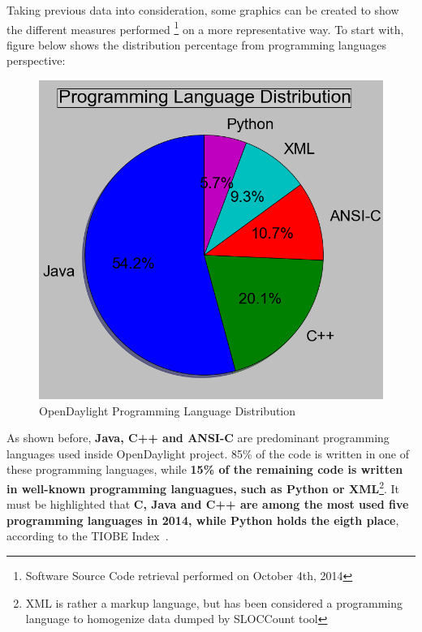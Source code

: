 \documentclass[a4paper, 12pt]{book}
\begin{document}
Taking previous data into consideration, some graphics can be created to show the different measures performed \footnote{Software Source Code retrieval performed on October 4th, 2014} on a more representative way. To start with, figure below shows the distribution percentage from programming languages perspective:
\begin{center}
 \begin{figure}[H]
 \begin{center}
   \includegraphics[width=15cm]{img/sloc-distritbution-01.png}
   \caption{OpenDaylight Programming Language Distribution}
   \label{fig:odl_prog_dist_diagram}
 \end{center}
 \end{figure}
\end{center}
As shown before, \textbf{Java, C++ and ANSI-C} are predominant programming languages used inside OpenDaylight project. 85\% of the code is written in one of these programming languages, while \textbf{15\% of the remaining code is written in well-known programming languagues, such as Python or XML}\footnote{XML is rather a markup language, but has been considered a programming language to homogenize data dumped by SLOCCount tool}. It must be highlighted that \textbf{C, Java and C++ are among the most used five programming languages in 2014, while Python holds the eigth place}, according to the TIOBE Index~\cite{TiobeIndex}.\\
\end{document}
